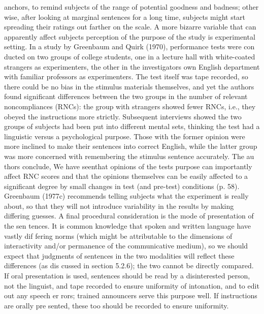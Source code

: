 \clearpage\setcounter{page}{1}\begin{styleTextbody}
anchors, to remind subjects of the range of potential goodness and badness; other\- wise, after looking at marginal sentences for a long time, subjects might start spreading their ratings out farther on the scale. A more bizarre variable that can apparently affect subjects{\textquotesingle} perception of the purpose of the study is experimental setting. In a study by Greenbaum and Quirk (1970), performance tests were con\- ducted on two groups of college students, one in a lecture hall with white-coated strangers as experimenters, the other in the investigators{\textquotesingle} own English department with familiar professors as experimenters. The test itself was tape recorded, so there could be no bias in the stimulus materials themselves, and yet the authors found significant differences between the two groups in the number of relevant noncompliances (RNCs): the group with strangers showed fewer RNCs, i.e., they obeyed the instructions more strictly. Subsequent interviews showed the two groups of subjects had been put into different mental sets, thinking the test had a linguistic versus a psychological purpose. Those with the former opinion were more inclined to make their sentences into correct English, while the latter group was more concerned with remembering the stimulus sentence accurately. The au\- thors conclude, {\textquotedbl}We have seenthat opinions of the test{\textquotesingle}s purpose can importantly affect RNC scores and that the opinions themselves can be easily affected to a significant degree by small changes in test (and pre-test) conditions{\textquotedbl} (p. 58). Greenbaum (1977c) recommends telling subjects what the experiment is really about, so that they will not introduce variability in the results by making differing guesses. A final procedural consideration is the mode of presentation of the sen\- tences. It is common knowledge that spoken and written language have vastly dif\- fering norms (which might be attributable to the dimensions of interactivity and/or permanence of the communicative medium), so we should expect that judgments of sentences in the two modalities will reflect these differences (as dis\- cussed in section 5.2.6); the two cannot be directly compared. If oral presentation is used, sentences should be read by a disinterested person, not the linguist, and tape recorded to ensure uniformity of intonation, and to edit out any speech er\- rors; trained announcers serve this purpose well. If instructions are orally pre\- sented, these too should be recorded to ensure uniformity.
\end{styleTextbody}


